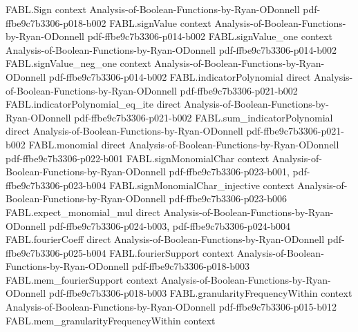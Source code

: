 \begin{theorem}
\label{FABL.noiseStability_eq_sum_level_rho_pow_mul_fourierWeight}
\leanok
{}
\proofstep
  {FABL.Sign}
  {context}
  {Analysis-of-Boolean-Functions-by-Ryan-ODonnell}
  {pdf-ffbe9c7b3306-p018-b002}
\proofstep
  {FABL.signValue}
  {context}
  {Analysis-of-Boolean-Functions-by-Ryan-ODonnell}
  {pdf-ffbe9c7b3306-p014-b002}
\proofstep
  {FABL.signValue_one}
  {context}
  {Analysis-of-Boolean-Functions-by-Ryan-ODonnell}
  {pdf-ffbe9c7b3306-p014-b002}
\proofstep
  {FABL.signValue_neg_one}
  {context}
  {Analysis-of-Boolean-Functions-by-Ryan-ODonnell}
  {pdf-ffbe9c7b3306-p014-b002}
\proofstep
  {FABL.indicatorPolynomial}
  {direct}
  {Analysis-of-Boolean-Functions-by-Ryan-ODonnell}
  {pdf-ffbe9c7b3306-p021-b002}
\proofstep
  {FABL.indicatorPolynomial_eq_ite}
  {direct}
  {Analysis-of-Boolean-Functions-by-Ryan-ODonnell}
  {pdf-ffbe9c7b3306-p021-b002}
\proofstep
  {FABL.sum_indicatorPolynomial}
  {direct}
  {Analysis-of-Boolean-Functions-by-Ryan-ODonnell}
  {pdf-ffbe9c7b3306-p021-b002}
\proofstep
  {FABL.monomial}
  {direct}
  {Analysis-of-Boolean-Functions-by-Ryan-ODonnell}
  {pdf-ffbe9c7b3306-p022-b001}
\proofstep
  {FABL.signMonomialChar}
  {context}
  {Analysis-of-Boolean-Functions-by-Ryan-ODonnell}
  {pdf-ffbe9c7b3306-p023-b001,
    pdf-ffbe9c7b3306-p023-b004}
\proofstep
  {FABL.signMonomialChar_injective}
  {context}
  {Analysis-of-Boolean-Functions-by-Ryan-ODonnell}
  {pdf-ffbe9c7b3306-p023-b006}
\proofstep
  {FABL.expect_monomial_mul}
  {direct}
  {Analysis-of-Boolean-Functions-by-Ryan-ODonnell}
  {pdf-ffbe9c7b3306-p024-b003,
    pdf-ffbe9c7b3306-p024-b004}
\proofstep
  {FABL.fourierCoeff}
  {direct}
  {Analysis-of-Boolean-Functions-by-Ryan-ODonnell}
  {pdf-ffbe9c7b3306-p025-b004}
\proofstep
  {FABL.fourierSupport}
  {context}
  {Analysis-of-Boolean-Functions-by-Ryan-ODonnell}
  {pdf-ffbe9c7b3306-p018-b003}
\proofstep
  {FABL.mem_fourierSupport}
  {context}
  {Analysis-of-Boolean-Functions-by-Ryan-ODonnell}
  {pdf-ffbe9c7b3306-p018-b003}
\proofstep
  {FABL.granularityFrequencyWithin}
  {context}
  {Analysis-of-Boolean-Functions-by-Ryan-ODonnell}
  {pdf-ffbe9c7b3306-p015-b012}
\proofstep
  {FABL.mem_granularityFrequencyWithin}
  {context}

\end{theorem}
